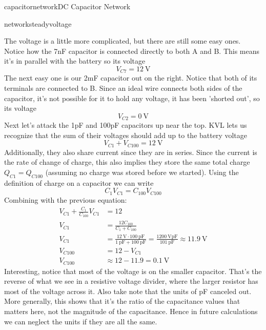 \begin{mainquestion}{capacitornetwork}{DC Capacitor Network}
\begin{partquestion}{networksteadyvoltage}
\begin{answer}
The voltage is a little more complicated, but there are still some easy ones. Notice how the 7nF capacitor is connected directly to both A and B. This means it's in parallel with the battery so its voltage
\[V_{C7} = \qty{12}{\volt}\]
The next easy one is our 2mF capacitor out on the right. Notice that both of its terminals are connected to B. Since an ideal wire connects both sides of the capacitor, it's not possible for it to hold any voltage, it has been 'shorted out', so its voltage \[V_{C2} = \qty{0}{\volt}\]
Next let's attack the 1pF and 100pF capacitors up near the top. KVL lets us recognize that the sum of their voltages should add up to the battery voltage
\[V_{C1} + V_{C100} = \qty{12}{\volt}\]
Additionally, they also share current since they are in series. Since the current is the rate of change of charge, this also implies they store the same total charge $Q_{C1} = Q_{C100}$ (assuming no charge was stored before we started). Using the definition of charge on a capacitor we can write
\[C_1V_{C1}=C_{100}V_{C100}\]
Combining with the previous equation:
\begin{align*}
V_{C1} + \frac{C_{1}}{C_{100}}V_{C1} &= 12 \\
V_{C1} &= \frac{12C_{100}}{C_1 + C_{100}} \\
V_{C1} &= \frac{\qty{12}{\volt}\cdot\qty{100}{\pico\farad}}{\qty{1}{\pico\farad} + \qty{100}{\pico\farad}} = \frac{\qty{1200}{\volt\pico\farad}}{\qty{101}{\pico\farad}} \approx \qty{11.9}{\volt} \\
V_{C100} &= 12 - V_{C1} \\
V_{C100} &\approx 12 - 11.9 = \qty{0.1}{\volt}
\end{align*}
Interesting, notice that most of the voltage is on the smaller capacitor. That's the reverse of what we see in a resistive voltage divider, where the larger resistor has most of the voltage across it. Also take note that the units of \unit{\pico\farad} canceled out. More generally, this shows that it's the ratio of the capacitance values that matters here, not the magnitude of the capacitance. Hence in future calculations we can neglect the units if they are all the same.


\end{answer}
\end{partquestion}
\end{mainquestion}

